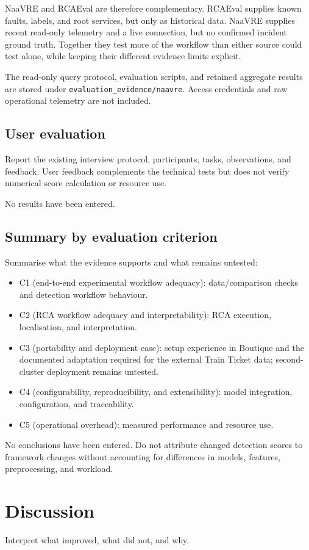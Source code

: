 NaaVRE and RCAEval are therefore complementary. RCAEval supplies known faults, labels, and root services, but only as historical data. NaaVRE supplies recent read-only telemetry and a live connection, but no confirmed incident ground truth. Together they test more of the workflow than either source could test alone, while keeping their different evidence limits explicit.

The read-only query protocol, evaluation scripts, and retained aggregate results are stored under \texttt{evaluation\_evidence/naavre}. Access credentials and raw operational telemetry are not included.

\subsection{User evaluation}

Report the existing interview protocol, participants, tasks, observations, and feedback. User feedback complements the technical tests but does not verify numerical score calculation or resource use.

No results have been entered.


\subsection{Summary by evaluation criterion}

Summarise what the evidence supports and what remains untested:
\begin{itemize}
    \item C1 (end-to-end experimental workflow adequacy): data/comparison checks and detection workflow behaviour.
    \item C2 (RCA workflow adequacy and interpretability): RCA execution, localisation, and interpretation.
    \item C3 (portability and deployment ease): setup experience in Boutique and the documented adaptation required for the external Train Ticket data; second-cluster deployment remains untested.
    \item C4 (configurability, reproducibility, and extensibility): model integration, configuration, and traceability.
    \item C5 (operational overhead): measured performance and resource use.
\end{itemize}

No conclusions have been entered. Do not attribute changed detection scores to framework changes without accounting for differences in models, features, preprocessing, and workload.



\section{Discussion}
Interpret what improved, what did not, and why.
